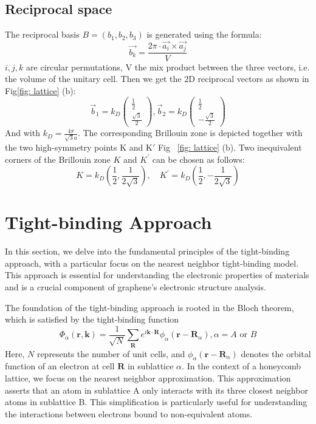 \subsection{Reciprocal space}
The reciprocal basis $B=\left(b_{1}, b_{2}, b_{3}\right)$ is generated using the formula:
$$
\overrightarrow{b_{k}}=\frac{2 \pi \cdot \overrightarrow{a_{i}} \times \overrightarrow{a_{j}}}{V}
$$
$i, j, k$ are circular permutations, $\mathrm{V}$ the mix product between the three vectors, i.e. the volume of the unitary cell.  Then we get the $2 \mathrm{D}$ reciprocal vectors as shown in Fig\ref{fig: lattice} (b):
$$
\vec b_{1}=k_{D}\left(\begin{array}{l}
\frac{1}{2} \\
\frac{\sqrt{3}}{2} 
\end{array}\right),
\vec b_{2}=k_{D}\left(\begin{array}{c}
\frac{1}{2} \\
-\frac{\sqrt{3}}{2} 
\end{array}\right)
$$
And with $k_{D}=\frac{4 \pi}{\sqrt{3} a}$. The corresponding Brillouin zone is depicted together with the two high-symmetry points $\mathrm{K}$ and $\mathrm{K'}$ Fig ~\ref{fig: lattice} (b).
Two inequivalent corners of the Brillouin zone $K$ and $K^{\prime}$ can be chosen as follows:
$$
K=k_{D}\left(\frac{1}{2}, \frac{1}{2 \sqrt{3}}\right), \quad K^{\prime}=k_{D}\left(\frac{1}{2},-\frac{1}{2 \sqrt{3}}\right)
$$

\section{Tight-binding Approach \label{sec:tightbinding}}

In this section, we delve into the fundamental principles of the tight-binding approach, with a particular focus on the nearest neighbor tight-binding model. This approach is essential for understanding the electronic properties of materials and is a crucial component of graphene's electronic structure analysis.

The foundation of the tight-binding approach is rooted in the Bloch theorem, which is satisfied by the tight-binding function
\begin{equation}
\Phi_{\alpha}(\mathbf{r}, \mathbf{k})=\frac{1}{\sqrt{N}} \sum_{\mathbf{R}} e^{i \mathbf{k} \cdot \mathbf{R}} \phi_{\alpha}\left(\mathbf{r}-\mathbf{R}_{\alpha}\right), \alpha=A \text { or } B
\label{eqn:Bloch}
\end{equation}
Here, $N$ represents the number of unit cells, and $\phi_{\alpha}(\mathbf{r} - \mathbf{R}_{\alpha})$ denotes the orbital function of an electron at cell $\mathbf{R}$ in sublattice $\alpha$.
In the context of a honeycomb lattice, we focus on the nearest neighbor approximation. This approximation asserts that an atom in sublattice A only interacts with its three closest neighbor atoms in sublattice B. This simplification is particularly useful for understanding the interactions between electrons bound to non-equivalent atoms.

